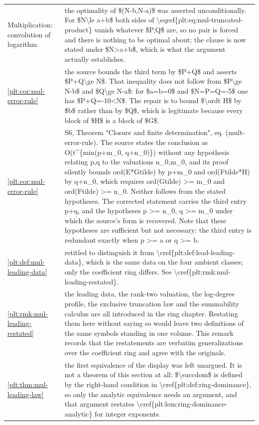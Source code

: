 \documentclass[11pt,oneside]{article}
\theoremstyle{plain}
\theoremstyle{definition}
\theoremstyle{remark}
\begin{document}
\begin{longtable}{@{}p{} p{}@{}}
Multiplication: convolution of logarithm & the optimality of \$(N-b,N-a)\$ was asserted unconditionally. For \$N\textbackslash le a+b\$ both sides of \textbackslash eqref\{plt:eq:mul-truncated-product\} vanish whatever \$P,Q\$ are, so no pair is forced and there is nothing to be optimal about; the clause is now stated under \$N>a+b\$, which is what the argument actually establishes.\\
\cref{plt:cor:mul-error-rule} & the source bounds the third term by \$P+Q\$ and asserts \$P+Q\textbackslash ge N\$. That inequality does not follow from \$P\textbackslash ge N-b\$ and \$Q\textbackslash ge N-a\$: for \$a=b=0\$ and \$N=P=Q=-5\$ one has \$P+Q=-10<N\$. The repair is to bound \$\textbackslash ordt H\$ by \$b\$ rather than by \$Q\$, which is legitimate because every block of \$H\$ is a block of \$G\$.\\
\cref{plt:cor:mul-error-rule} & S6, Theorem "Closure and finite determination", eq. (mult-error-rule). The source states the conclusion as O(t\textasciicircum \{min(p+m\_0, q+n\_0)\}) without any hypothesis relating p,q to the valuations n\_0,m\_0, and its proof silently bounds ord(E*Gtilde) by p+m\_0 and ord(Ftilde*H) by q+n\_0, which requires ord(Gtilde) >= m\_0 and ord(Ftilde) >= n\_0. Neither follows from the stated hypotheses. The corrected statement carries the third entry p+q, and the hypotheses p >= n\_0, q >= m\_0 under which the source's form is recovered. Note that these hypotheses are sufficient but not necessary: the third entry is redundant exactly when p >= a or q >= b.\\
\cref{plt:def:mul-leading-data} & retitled to distinguish it from \textbackslash cref\{plt:def:lead-leading-data\}, which is the same data on the four ambient classes; only the coefficient ring differs. See \textbackslash cref\{plt:rmk:mul-leading-restated\}.\\
\cref{plt:rmk:mul-leading-restated} & the leading data, the rank-two valuation, the log-degree profile, the exclusive truncation law and the summability calculus are all introduced in the ring chapter. Restating them here without saying so would leave two definitions of the same symbols standing in one volume. This remark records that the restatements are verbatim generalizations over the coefficient ring and agree with the originals.\\
\cref{plt:thm:mul-leading-law} & the first equivalence of the display was left unargued. It is not a theorem of this section at all: \$\textbackslash succdom\$ is defined by the right-hand condition in \textbackslash cref\{plt:def:ring-dominance\}, so only the analytic equivalence needs an argument, and that argument restates \textbackslash cref\{plt:lem:ring-dominance-analytic\} for integer exponents.\\

\end{longtable}
\end{document}
